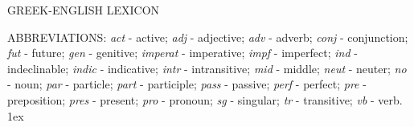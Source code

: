 \thispagestyle{empty}
\begin{center}
{\Huge GREEK-ENGLISH LEXICON}
\end{center}
\newpage

\pagestyle{fancy}
\cfoot{\gr{\kern -.7pt }}

{\small
\twocolumn
\noindent ABBREVIATIONS: {\em act} - active;
{\em adj} - adjective; {\em adv} - adverb; {\em conj} - conjunction; {\em fut} - future; {\em gen} - genitive; {\em imperat} - imperative; {\em impf} - imperfect;
{\em ind} - indeclinable; {\em indic} - indicative;
{\em intr} - intransitive; {\em mid} - middle; {\em neut} - neuter;
{\em no} - noun; 
{\em par} - particle; {\em part} - participle; {\em pass} - passive; {\em perf} - perfect;
{\em pre} - preposition; {\em pres} - present; {\em pro} - pronoun; {\em sg} - singular;
{\em tr} - transitive; {\em vb} - verb.
\baselineskip 1ex

}
